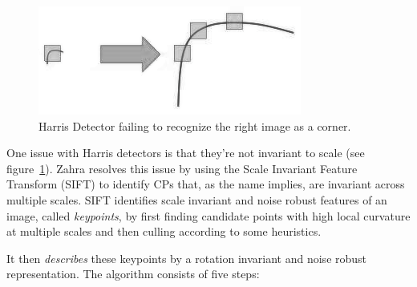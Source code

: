 \begin{figure}
	\centering
	\includegraphics[width=\linewidth,keepaspectratio]{figures/registration/sift/sift_scale_invariant.png}
	\caption{Harris Detector failing to recognize the right image as a corner.}
	\label{fig:sift_harris}
\end{figure}
One issue with Harris detectors is that they're not invariant to scale (see figure~\ref{fig:sift_harris}).
%
Zahra \etal\cite{zahrasift} resolves this issue by using the Scale Invariant Feature Transform\cite{lowe2004distinctive} (SIFT) to identify CPs that, as the name implies, are invariant across multiple scales.
%
SIFT identifies scale invariant and noise robust features of an image, called \textit{keypoints}, by first finding candidate points with high local curvature at multiple scales and then culling according to some heuristics.

%
It then \textit{describes} these keypoints by a rotation invariant and noise robust representation.
%
The algorithm consists of five steps:
%
